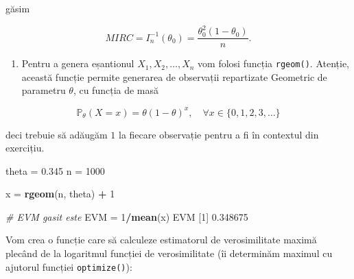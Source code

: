 \documentclass[]{article}
\newenvironment{Shaded}{\begin{snugshade}}{\end{snugshade}}
\newcommand{\KeywordTok}[1]{\textcolor[rgb]{0.13,0.29,0.53}{\textbf{#1}}}
\newcommand{\DecValTok}[1]{\textcolor[rgb]{0.00,0.00,0.81}{#1}}
\newcommand{\FloatTok}[1]{\textcolor[rgb]{0.00,0.00,0.81}{#1}}
\newcommand{\StringTok}[1]{\textcolor[rgb]{0.31,0.60,0.02}{#1}}
\newcommand{\CommentTok}[1]{\textcolor[rgb]{0.56,0.35,0.01}{\textit{#1}}}
\newcommand{\OperatorTok}[1]{\textcolor[rgb]{0.81,0.36,0.00}{\textbf{#1}}}
\newcommand{\NormalTok}[1]{#1}
\providecommand{\tightlist}{%
  \setlength{\itemsep}{0pt}\setlength{\parskip}{0pt}}
\begin{document}
găsim

\[
  MIRC = I_n^{-1}(\theta_0) = \frac{\theta_0^2(1-\theta_0)}{n}.
\]

\begin{enumerate}
\def\labelenumi{\alph{enumi})}
\setcounter{enumi}{6}
\tightlist
\item
  Pentru a genera eșantionul \(X_1, X_2, \ldots, X_n\) vom folosi
  funcția \texttt{rgeom()}. Atenție, această funcție permite generarea
  de observații repartizate Geometric de parametru \(\theta\), cu
  funcția de masă
\end{enumerate}

\[
 \mathbb{P}_{\theta}(X = x) = \theta (1-\theta)^{x}, \quad \forall x\in\{0,1,2,3,\ldots\}  
\]

deci trebuie să adăugăm \(1\) la fiecare observație pentru a fi în
contextul din exercițiu.

\begin{Shaded}
\begin{Highlighting}[]
\NormalTok{theta =}\StringTok{ }\FloatTok{0.345}
\NormalTok{n =}\StringTok{ }\DecValTok{1000}

\NormalTok{x =}\StringTok{ }\KeywordTok{rgeom}\NormalTok{(n, theta) }\OperatorTok{+}\StringTok{ }\DecValTok{1}

\CommentTok{# EVM gasit este }
\NormalTok{EVM =}\StringTok{ }\DecValTok{1}\OperatorTok{/}\KeywordTok{mean}\NormalTok{(x)}
\NormalTok{EVM}
\NormalTok{[}\DecValTok{1}\NormalTok{] }\FloatTok{0.348675}
\end{Highlighting}
\end{Shaded}

Vom crea o funcție care să calculeze estimatorul de verosimilitate
maximă plecând de la logaritmul funcției de verosimilitate (îi
determinăm maximul cu ajutorul funcției \texttt{optimize()}):
\end{document}
